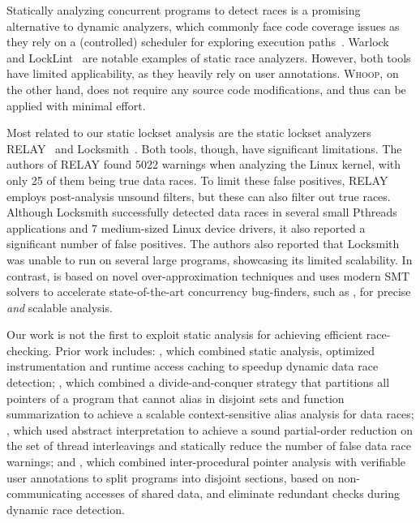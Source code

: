 Statically analyzing concurrent programs to detect races is a promising alternative to dynamic analyzers, which commonly face code coverage issues as they rely on a (controlled) scheduler for exploring execution paths~\cite{musuvathi2008finding}. Warlock~\cite{sterling1993warlock} and LockLint~\cite{oracle2010locklint} are notable examples of static race analyzers. However, both tools have limited applicability, as they heavily rely on user annotations. \textsc{Whoop}, on the other hand, does not require any source code modifications, and thus can be applied with minimal effort.

Most related to our static lockset analysis are the static lockset analyzers RELAY~\cite{voung2007relay} and Locksmith~\cite{pratikakis2006locksmith}. Both tools, though, have significant limitations. The authors of RELAY found 5022 warnings when analyzing the Linux kernel, with only 25 of them being true data races. To limit these false positives, RELAY employs post-analysis unsound filters, but these can also filter out true races. Although Locksmith successfully detected data races in several small Pthreads applications and 7 medium-sized Linux device drivers, it also reported a significant number of false positives. The authors also reported that Locksmith was unable to run on several large programs, showcasing its limited scalability. In contrast, \whoop is based on novel over-approximation techniques and uses modern SMT solvers to accelerate state-of-the-art concurrency bug-finders, such as \corral, for precise \emph{and} scalable analysis.

Our work is not the first to exploit static analysis for achieving efficient race-checking. Prior work includes: \cite{choi2002efficient}, which combined static analysis, optimized instrumentation and runtime access caching to speedup dynamic data race detection; \cite{kahlon2007fast}, which combined a divide-and-conquer strategy that partitions all pointers of a program that cannot alias in disjoint sets and function summarization to achieve a scalable context-sensitive alias analysis for data races; \cite{kahlon2009semantic}, which used abstract interpretation to achieve a sound partial-order reduction on the set of thread interleavings and statically reduce the number of false data race warnings; and \cite{das2015section}, which combined inter-procedural pointer analysis with verifiable user annotations to split programs into disjoint sections, based on non-communicating accesses of shared data, and eliminate redundant checks during dynamic race detection.